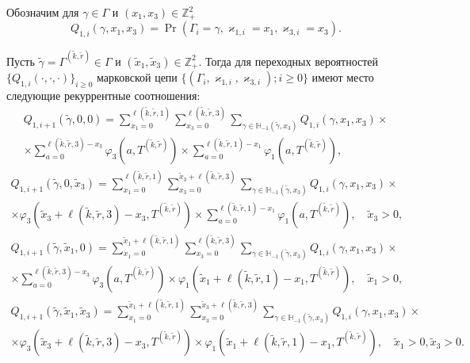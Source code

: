 \documentclass{report}
\begin{document}
Обозначим для $\gamma \in \Gamma$ и $(x_1,x_3) \in {\mathbb Z}_+^2$
\begin{equation}
Q_{1,i}(\gamma,x_1,x_3) = \Pr(\Gamma_{i}=\gamma, \varkappa_{1,i}=x_1, \varkappa_{3,i}=x_3).
\end{equation}

\begin{theorem}
Пусть $\tilde{\gamma} =\Gamma^{(\tilde{k},\tilde{r})}\in \Gamma$ и $(\tilde{x}_1, \tilde{x}_3) \in {\mathbb Z}_+^2$. Тогда для переходных вероятностей $\{Q_{1,i}(\cdot,\cdot,\cdot)\}_{i\geqslant 0}$ марковской цепи $\{(\Gamma_i, \varkappa_{1,i},\varkappa_{3,i}); i \geqslant 0\} $ имеют место следующие рекуррентные соотношения:
\begin{multline*}
Q_{1,i+1}(\tilde{\gamma},0, 0)= 
\sum_{x_1=0}^{\ell(\tilde{k},\tilde{r},1)} \sum_{x_3=0}^{\ell(\tilde{k},\tilde{r},3)} \sum_{\gamma \in {\mathbb H}_{-1}(\tilde{\gamma},x_3)}Q_{1,i}(\gamma,x_1, x_3)\times \\ \times
\sum_{a=0}^{\ell(\tilde{k},\tilde{r},3)-x_3}\varphi_3(a,T^{(\tilde{k},\tilde{r})}) \times \sum_{a=0}^{\ell(\tilde{k},\tilde{r},1)-x_1}\varphi_1(a,T^{(\tilde{k},\tilde{r})}),
\end{multline*}
\begin{multline*}
Q_{1,i+1}(\tilde{\gamma},0, \tilde{x}_3)= 
\sum_{x_1=0}^{\ell(\tilde{k},\tilde{r},1)} \sum_{x_3=0}^{\tilde{x}_3 + \ell(\tilde{k},\tilde{r},3)} \sum_{\gamma \in {\mathbb H}_{-1}(\tilde{\gamma},x_3)}Q_{1,i}(\gamma,x_1, x_3) \times  \\ \times \varphi_3(\tilde{x}_3 + \ell(\tilde{k},\tilde{r},3) - x_3,T^{(\tilde{k},\tilde{r})})  \times \sum_{a=0}^{\ell(\tilde{k},\tilde{r},1)-x_1}\varphi_1(a,T^{(\tilde{k},\tilde{r})}), \quad \tilde{x}_3 > 0,
\end{multline*}
\begin{multline*}
Q_{1,i+1}(\tilde{\gamma},\tilde{x}_1, 0)= 
\sum_{x_1=0}^{\tilde{x}_1 + \ell(\tilde{k},\tilde{r},1) } \sum_{x_3=0}^{\ell(\tilde{k},\tilde{r},3)} \sum_{\gamma \in {\mathbb H}_{-1}(\tilde{\gamma},x_3)}Q_{1,i}(\gamma,x_1, x_3) \times  \\ \times \sum_{a=0}^{\ell(\tilde{k},\tilde{r},3)-x_3}\varphi_3(a,T^{(\tilde{k},\tilde{r})}) \times \varphi_1(\tilde{x}_1 + \ell(\tilde{k},\tilde{r},1) - x_1,T^{(\tilde{k},\tilde{r})}), \quad \tilde{x}_1 > 0,
\end{multline*}
\begin{multline*}
Q_{1,i+1}(\tilde{\gamma},\tilde{x}_1, \tilde{x}_3)= 
\sum_{x_1=0}^{\tilde{x}_1 +\ell(\tilde{k},\tilde{r},1)} \sum_{x_3=0}^{\tilde{x}_3 +\ell(\tilde{k},\tilde{r},3)} \sum_{\gamma \in {\mathbb H}_{-1}(\tilde{\gamma},x_3)}Q_{1,i}(\gamma,x_1, x_3) \times  \\ \times \varphi_3(\tilde{x}_3 + \ell(\tilde{k},\tilde{r},3) - x_3,T^{(\tilde{k},\tilde{r})})  \times \varphi_1(\tilde{x}_1 + \ell(\tilde{k},\tilde{r},1)-x_1,T^{(\tilde{k},\tilde{r})}), \quad \tilde{x}_1 > 0, \tilde{x}_3 > 0.
\end{multline*}
\label{prob:rek:1}
\end{theorem}
\end{document}
